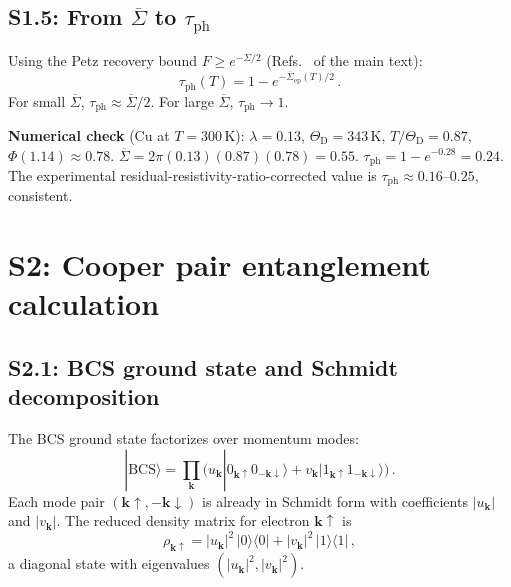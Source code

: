 \documentclass[prb,twocolumn,superscriptaddress,longbibliography,floatfix]{revtex4-2}
\newcommand{\ket}[1]{|#1\rangle}
\newcommand{\op}[2]{|#1\rangle\langle#2|}
\newcommand{\tauasym}{\tau}
\newcommand{\taudec}{\tauasym_{\mathrm{ph}}}
\newcommand{\ThetaD}{\Theta_{\mathrm{D}}}
\begin{document}
\subsection{S1.5: From $\overline{\Sigma}$ to $\taudec$}

Using the Petz recovery bound $F \geq e^{-\Sigma/2}$
(Refs.~\cite{Junge2018,Fawzi2015} of the main text):
\begin{equation}\label{eq:S1_tau}
  \taudec(T) = 1 - e^{-\overline{\Sigma}_{\mathrm{ep}}(T)/2}\,.
\end{equation}
For small $\overline{\Sigma}$,
$\taudec \approx \overline{\Sigma}/2$.  For large
$\overline{\Sigma}$, $\taudec \to 1$.

\textbf{Numerical check} (Cu at $T = 300\,$K):
$\lambda = 0.13$, $\ThetaD = 343\,$K, $T/\ThetaD = 0.87$,
$\Phi(1.14) \approx 0.78$.
$\overline{\Sigma} = 2\pi(0.13)(0.87)(0.78) = 0.55$.
$\taudec = 1 - e^{-0.28} = 0.24$.
The experimental residual-resistivity-ratio-corrected value is
$\taudec \approx 0.16$--$0.25$, consistent.

\section{S2: Cooper pair entanglement calculation}
\label{sec:S2}

\subsection{S2.1: BCS ground state and Schmidt decomposition}

The BCS ground state factorizes over momentum modes:
\begin{equation}
  \ket{\mathrm{BCS}} = \prod_{\bm{k}}
  \bigl(u_{\bm{k}}\ket{0_{\bm{k}\uparrow} 0_{-\bm{k}\downarrow}}
  + v_{\bm{k}}\ket{1_{\bm{k}\uparrow} 1_{-\bm{k}\downarrow}}\bigr)\,.
\end{equation}
Each mode pair $(\bm{k}\!\uparrow, -\bm{k}\!\downarrow)$ is
already in Schmidt form with coefficients $|u_{\bm{k}}|$ and
$|v_{\bm{k}}|$.  The reduced density matrix for electron
$\bm{k}\!\uparrow$ is
\begin{equation}
  \rho_{\bm{k}\uparrow} = |u_{\bm{k}}|^2\, \op{0}{0}
  + |v_{\bm{k}}|^2\, \op{1}{1}\,,
\end{equation}
a diagonal state with eigenvalues $(|u_{\bm{k}}|^2, |v_{\bm{k}}|^2)$.
\end{document}
